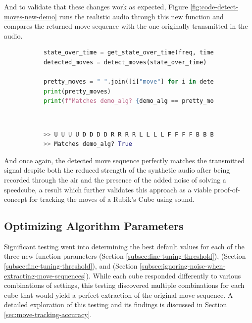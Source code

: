 And to validate that these changes work as expected, Figure
\ref{fig:code-detect-moves-new-demo} runs the realistic audio through
this new  function and compares the returned move
sequence with the one originally transmitted in the audio.

\begin{figure}[h]
\caption{Example: Refined move sequence extraction}
\label{fig:code-detect-moves-new-demo}
\begin{subfigure}{\textwidth}
\begin{lstlisting}[language=Python]
state_over_time = get_state_over_time(freq, time, spectrogram)
detected_moves = detect_moves(state_over_time)

pretty_moves = " ".join([i["move"] for i in detected_moves])
print(pretty_moves)   
print(f"Matches demo_alg? {demo_alg == pretty_moves}")
\end{lstlisting}
\end{subfigure}\\

\begin{subfigure}{\textwidth}
\begin{lstlisting}[language=Python, numbers=none]
>> U U U U D D D D R R R R L L L L F F F F B B B B
>> Matches demo_alg? True
\end{lstlisting}
\end{subfigure}
\end{figure}

And once again, the detected move sequence perfectly matches the
transmitted signal despite both the reduced strength of the synthetic
audio after being recorded through the air and the presence of the
added noise of solving a speedcube, a result which further validates
this approach as a viable proof-of-concept for tracking the moves of a
Rubik's Cube using sound.

\subsection{Optimizing Algorithm Parameters}
\label{subsec:optimizing-params}

Significant testing went into determining the best default values for
each of the three new function parameters  (Section
\ref{subsec:fine-tuning-threshold}),  (Section
\ref{subsec:fine-tuning-threshold}), and  (Section
\ref{subsec:ignoring-noise-when-extracting-move-sequences}). While each
cube responded differently to various combinations of settings, this
testing discovered multiple combinations for each cube that would yield
a perfect extraction of the original move sequence. A detailed
exploration of this testing and its findings is discussed in Section
\ref{sec:move-tracking-accuracy}.

